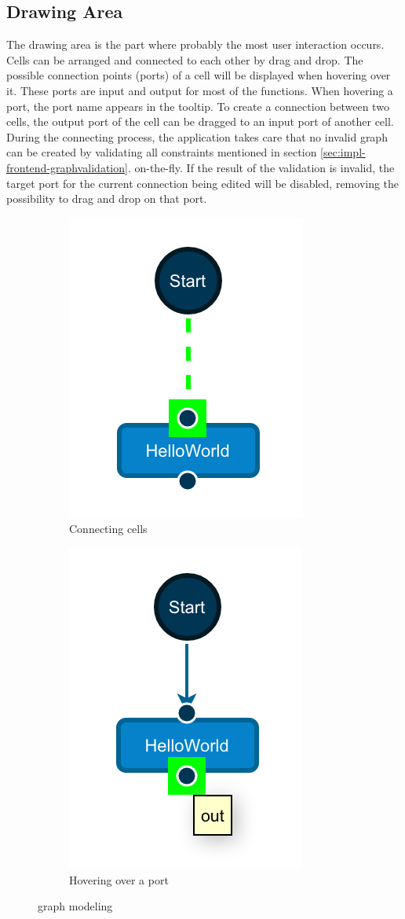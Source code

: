 \documentclass[a4paper,12pt,pdftex,halfparskip,cleardoubleempty,bibtotoc,liststotoc]{scrbook}
\begin{document}
\subsection{Drawing Area}

The drawing area is the part where probably the most user interaction occurs.\\ Cells can be arranged and connected to each other by drag and drop.
The possible connection points (ports) of a cell will be displayed when hovering over it. These ports are input and output for most of the functions.
When hovering a port, the port name appears in the tooltip.
To create a connection between two cells, the output port of the cell can be dragged to an input port of another cell.
During the connecting process, the application takes care that no invalid graph can be created by validating all constraints mentioned in section \ref{sec:impl-frontend-graphvalidation}. on-the-fly. If the result of the validation is invalid, the target port for the current connection being edited will be disabled, removing the possibility to drag and drop on that port.

\begin{figure}
\centering
\begin{subfigure}{.4\textwidth}
  \centering
  \includegraphics[width=.4\linewidth]{connect}
  \caption{Connecting cells}
  \label{fig:sub1}
\end{subfigure}
\begin{subfigure}{.4\textwidth}
  \centering
  \includegraphics[width=.4\linewidth]{port-hover}
  \caption{Hovering over a port}
  \label{fig:sub2}
\end{subfigure}
\caption{graph modeling}
\label{fig:test}
\end{figure}
\end{document}
